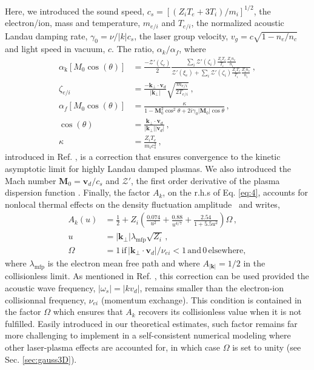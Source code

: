 \documentclass[%
 reprint,
 amsmath,amssymb,
 aps,
]{revtex4-1}
\begin{document}
Here, we introduced the sound speed, $c_s=[(Z_iT_e+3T_i)/m_i]^{1/2}$,  the  electron/ion, mass and  temperature, $ m_{e/i}$ and $T_{e/i}$,  the normalized acoustic Landau damping rate, $\gamma_0=\nu/\vert k\vert c_s$, the laser group velocity, $v_g=c\sqrt{1-n_e/n_c}$ and  light speed in vacuum, $c$.
The ratio, $\alpha_k/\alpha_f$, where 
\begin{align}
 \alpha_ \mathrm{k} [M_0\cos(\theta)]   & = \frac{-\mathcal{Z}'( \zeta_e) }{2}\frac{\sum_i \mathcal{Z}'( \zeta_i)\frac{  Z_iT_e}{ T_i } \frac{  Z_in_e}{ n_i }  }{\mathcal{Z}'( \xi_e)+ \sum_i \mathcal{Z}'( \zeta_i)\frac{  Z_iT_e}{ T_i } \frac{  Z_in_e}{ n_i }   } \, ,\label{eq:drakek}
 \\
\zeta_{e/i} &=  \frac{-\mathbf{k}_\perp\cdot\mathbf{v}_{d} }{\vert \mathbf{k}_\perp \vert } \sqrt{ \frac{ m_{e/i} }{ 2T_{e/i} }  }   \label{eq:xi} \, , \\
 \alpha_f[M_0\cos(\theta)]   & =\frac{\kappa}{1-\mathbf{M}_0^2\cos^2\theta +2i\gamma_0 \vert\mathbf{M}_0\vert \cos\theta}  \, ,  \label{eq:drakeh} \\
 \cos(\theta)& = \frac{\mathbf{k}_\perp\cdot\mathbf{v}_{d} }{\vert \mathbf{k}_\perp \vert \vert \mathbf{v}_{d}\vert  } \, , \label{eq:hydro} \\
 \kappa &= \frac{Z_iT_e}{m_ic_s^2} \, ,
\end{align}
introduced in Ref. \cite[]{POP_Ruyer_2020}, is a correction that ensures convergence to the  kinetic asymptotic limit for highly Landau damped plasmas. 
We also introduced the Mach number $\mathbf{M}_0= \mathbf{v}_d/c_s$ and $\mathcal{Z}'$, the first order derivative of the plasma dispersion function \cite{Fried_Gell-Mann_1960}.
Finally, the factor $A_k$, on the r.h.s of Eq. \eqref{eq:4},  accounts for nonlocal thermal effects on the density fluctuation amplitude~\cite[]{POP_Brantov_1998,Bychenkov_2000} and writes,
\begin{align}
     A_k(u)   &= \frac{1}{2} +Z_i\left( \frac{0.074}{u^2}+ \frac{0.88}{u^{4/7}} + \frac{2.54}{1+5.5u^2} \right) \Omega\, ,\nonumber \\ 
     u &=\vert \mathbf{k}_\perp \vert\lambda_\mathrm{mfp} \sqrt{Z_i}\label{eq:nl}\, , \nonumber\\
     \Omega &= 1\,  \mathrm{if}\, \vert \mathbf{k}_\perp\cdot \mathbf{v}_d\vert/\nu_{ei}<1 \, \mathrm{and}\, 0 \, \mathrm{elsewhere, } 
\end{align}
where $\lambda_\mathrm{mfp}$ is the electron mean free path and where $A_{\vert \mathbf{k}\vert}=1/2$ in the collisionless limit. 
%
As mentioned in Ref. \cite[]{Berger_2005}, this correction can be used provided the acoustic wave frequency, $\vert \omega_s\vert= \vert kv_d \vert $, remains smaller than the electron-ion collisionnal frequency, $\nu_{ei}$ (momentum exchange). This condition is contained in the factor $\Omega$ which ensures that $A_k$ recovers its collisionless value when it is not fulfilled. Easily introduced in our theoretical estimates, such factor remains far more challenging to implement  in a self-consistent numerical modeling where other laser-plasma effects are accounted for, in which case $\Omega$ is set to unity (see Sec. \ref{sec:gauss3D}).
\end{document}
